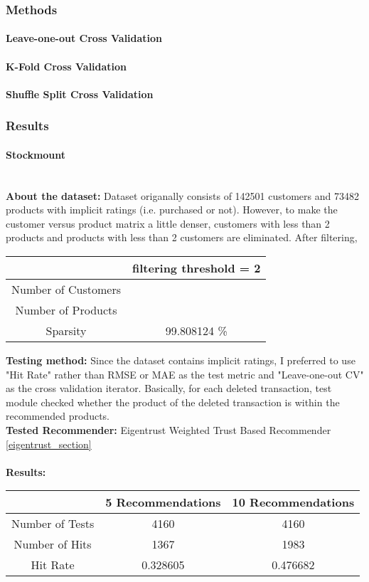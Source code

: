 	\subsubsection{Methods}
	\paragraph{Leave-one-out Cross Validation}
	\paragraph{K-Fold Cross Validation}
	\paragraph{Shuffle Split Cross Validation}
	\subsubsection{Results}
	\paragraph{Stockmount} \mbox{}\\
	\textbf{About the dataset:} Dataset origanally consists of 142501 customers and 73482 products with implicit ratings (i.e. purchased or not). However, to make the customer versus product matrix a little denser, customers with less than 2 products and products with less than 2 customers are eliminated. After filtering,
	\begin{center}
		\begin{tabular}{ | c | c |}
			\hline
			& filtering threshold = 2\\ 
			\hline
			Number of Customers & \\  
			\hline
			Number of Products & \\  
			\hline
			Sparsity & 99.808124 \% \\   
			\hline
		\end{tabular}
	\end{center} 
	\vspace{0.5cm}
	\textbf{Testing method:} Since the dataset contains implicit ratings, I preferred to use "Hit Rate" rather than RMSE or MAE as the test metric and "Leave-one-out CV" as the cross validation iterator. Basically, for each deleted transaction, test module checked whether the product of the deleted transaction is within the recommended products.\\
	\textbf{Tested Recommender:} Eigentrust Weighted Trust Based Recommender \ref{eigentrust_section} \\ \\
	\textbf{Results:}
	\begin{center}
		\begin{tabular}{ | c | c | c |}
			\hline
			& 5 Recommendations & 10 Recommendations\\ 
			\hline
			Number of Tests&  4160 & 4160\\  
			\hline
			Number of Hits&  1367 & 1983\\  
			\hline
			Hit Rate &   0.328605 & 0.476682\\  
			\hline
		\end{tabular}
	\end{center} 

